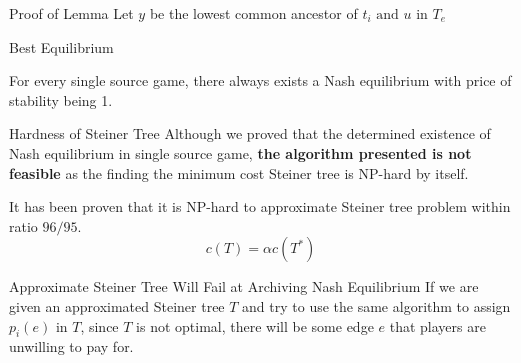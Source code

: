 \documentclass[11pt,aspectratio=169]{beamer}
\begin{document}
\begin{frame}{Proof of Lemma}
    Let $y$ be the lowest common ancestor of $t_i \text{ and } u \text{ in } T_e$
\end{frame}

\begin{frame}{Best Equilibrium}
    \begin{theorem}
        For every single source game, there always exists a Nash equilibrium with price of stability being 1.
    \end{theorem}
\end{frame}

\begin{frame}{Hardness of Steiner Tree}
    Although we proved that the determined existence of Nash equilibrium in single source game, \textbf{the algorithm presented is not feasible} as the finding the minimum cost Steiner tree is NP-hard by itself. \\
    \vspace{10pt}

    It has been proven that it is NP-hard to approximate Steiner tree problem within ratio \(96/95\). \\
    \begin{equation*}
        c(T) = \alpha c(T^*)
    \end{equation*}
   
\end{frame}

\begin{frame}{Approximate Steiner Tree Will Fail at Archiving Nash Equilibrium}
If we are given an approximated Steiner tree \(T\) and try to use the same algorithm to assign \(p_i(e)\) in \(T\), since \(T\) is not optimal, there will be some edge \(e\) that players are unwilling to pay for. \\
\vspace{20pt}
\centering
{}
\end{frame}
\end{document}
